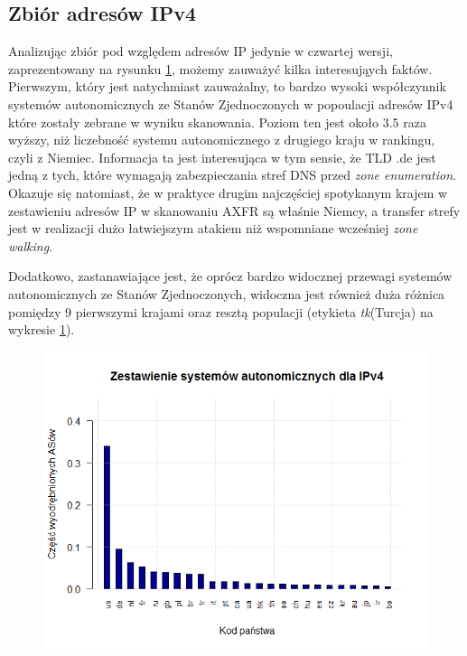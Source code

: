 \subsection{Zbiór adresów IPv4}
\label{sec:ipv4_results}
Analizując zbiór pod względem adresów IP jedynie w czwartej wersji, zaprezentowany na rysunku \ref{fig:ipv4_countries}, możemy zauważyć kilka interesująych faktów. Pierwszym, który jest natychmiast zauważalny, to bardzo wysoki współczynnik systemów autonomicznych ze Stanów Zjednoczonych w popoulacji adresów IPv4 które zostały zebrane w wyniku skanowania. Poziom ten jest około 3.5 raza wyższy, niż liczebność systemu autonomicznego z drugiego kraju w rankingu, czyli z Niemiec. Informacja ta jest interesująca w tym sensie, że TLD .de jest jedną z tych, które wymagają zabezpieczania stref DNS przed \textit{zone enumeration}\cite{}. Okazuje się natomiast, że w praktyce drugim najczęściej spotykanym krajem w zestawieniu adresów IP w skanowaniu AXFR są właśnie Niemcy, a transfer strefy jest w realizacji dużo łatwiejszym atakiem niż wspomniane wcześniej \textit{zone walking}.

Dodatkowo, zastanawiające jest, że oprócz bardzo widocznej przewagi systemów autonomicznych ze Stanów Zjednoczonych, widoczna jest również duża różnica pomiędzy 9 pierwszymi krajami oraz resztą populacji (etykieta \textit{tk}(Turcja) na wykresie \ref{fig:ipv4_countries}). 

\begin{figure}[ht]
	\centering
	\includegraphics[width=1.0\textwidth]{image/ipv4_as_countries}
	\caption{}
	\label{fig:ipv4_countries}
\end{figure}

